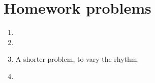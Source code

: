 \chapterhardbreak
\section*{Homework problems}

\begin{enumerate}
\item \lipsum[46]
\item \lipsum[47]
\item A shorter problem, to vary the rhythm.
\item \lipsum[48]
\end{enumerate}